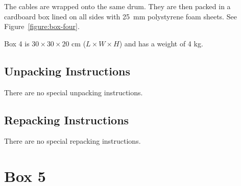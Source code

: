 \documentclass{article}
\begin{document}
The cables are wrapped onto the same drum. They are then packed in a cardboard box lined on all sides with 25~mm polystyrene foam sheets. See Figure~\ref{figure:box-four}.

Box 4 is $30 \times 30 \times 20$ cm ($L \times W \times H$) and has a weight of 4 kg.

\subsection{Unpacking Instructions}

There are no special unpacking instructions.

\subsection{Repacking Instructions}

There are no special repacking instructions.


\clearpage
\section{Box 5}
\end{document}
